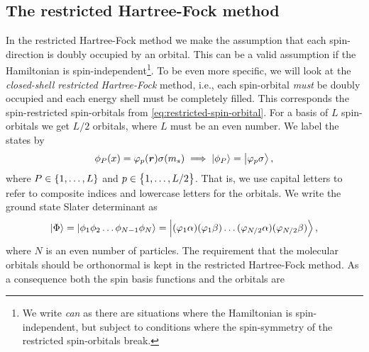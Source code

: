        \subsection{The restricted Hartree-Fock method}
            In the restricted Hartree-Fock method we make the assumption that
            each spin-direction is doubly occupied by an orbital.
            This can be a valid assumption if the Hamiltonian is
            spin-independent\footnote{%
                We write \emph{can} as there are situations where the
                Hamiltonian is spin-independent, but subject to conditions where
                the spin-symmetry of the restricted spin-orbitals break.
            }.
            To be even more specific, we will look at the \emph{closed-shell
            restricted Hartree-Fock} method, i.e., each spin-orbital \emph{must}
            be doubly occupied and each energy shell must be completely filled.
            This corresponds the spin-restricted spin-orbitals from
            \autoref{eq:restricted-spin-orbital}.
            For a basis of $L$ spin-orbitals we get $L/2$ orbitals, where $L$
            must be an even number.
            We label the states by
            \begin{align}
                \phi_{P}(x) = \varphi_p(\boldsymbol{r}) \sigma(m_s)
                \implies
                \ket{\phi_P} = \ket{\varphi_p\sigma},
            \end{align}
            where $P \in \left\{ 1, \dots, L \right\}$ and $p \in \left\{ 1, \dots, L / 2 \right\}$.
            That is, we use capital letters to refer to composite indices and
            lowercase letters for the orbitals.
            We write the ground state Slater determinant as
            \begin{align}
                \ket{\Phi} = \ket{\phi_1 \phi_2 \dots \phi_{N - 1} \phi_N}
                = \ket{
                    (\varphi_1 \alpha)
                    (\varphi_1 \beta)
                    \dots
                    (\varphi_{N / 2} \alpha)
                    (\varphi_{N / 2}\beta)
                },
            \end{align}
            where $N$ is an even number of particles.
            The requirement that the molecular orbitals should be orthonormal is
            kept in the restricted Hartree-Fock method.
            As a consequence both the spin basis functions and the orbitals are
